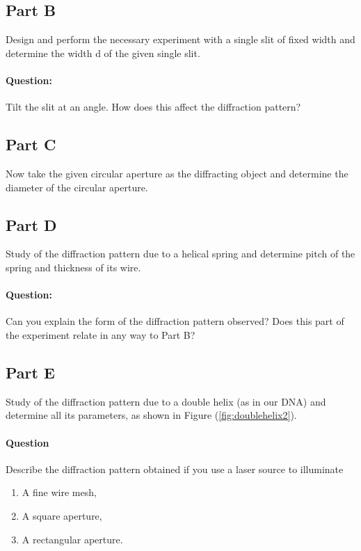 \begin{refsection}
\subsection*{Part B}

Design and perform the necessary experiment with a single slit of fixed width and determine the width d of the given single slit.

\begin{question}
\paragraph{Question:} Tilt the slit at an angle. How does this affect the diffraction pattern?
\end{question}


\subsection*{Part C}

Now take the given circular aperture as the diffracting object and determine the diameter of the circular aperture.

\subsection*{Part D}

Study of the diffraction pattern due to a helical spring and determine pitch of the spring and thickness of its wire. 


\begin{question}
\paragraph{Question:} Can you explain the form of the diffraction pattern observed? Does this part of the experiment relate in any way to Part B? 
\end{question}

\subsection*{Part E}

Study of the diffraction pattern due to a double helix (as in our DNA) and determine all its parameters, as shown in Figure (\ref{fig:doublehelix2}).

\begin{question}
\paragraph{Question} Describe the diffraction pattern obtained if you use a laser source to illuminate
\begin{enumerate}[label=(\alph*)]
    \itemsep0em
    \item A fine wire mesh,
    \item A square aperture,
    \item A rectangular aperture.
\end{enumerate}
\end{question}




\end{refsection}
